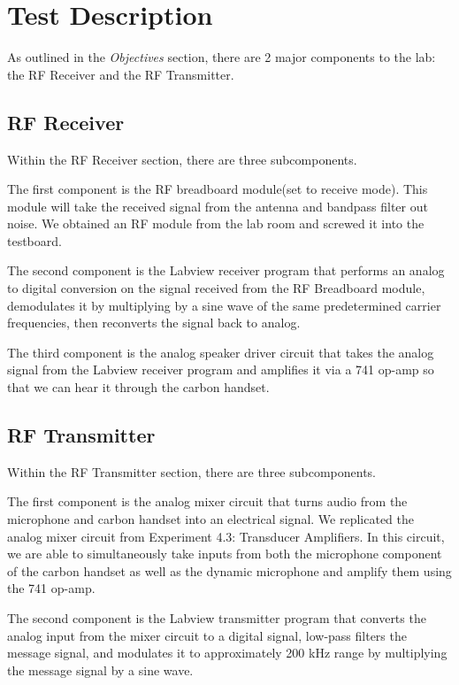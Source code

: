 \documentclass[10pt]{article}
\begin{document}
\medskip


\section{Test Description}

As outlined in the \textit{Objectives} section, there are 2 major components to the lab: the RF Receiver and the RF Transmitter. 

\subsection{RF Receiver}
Within the RF Receiver section, there are three subcomponents. 

The first component is the RF breadboard module(set to receive mode). This module will take the received signal from the antenna and bandpass filter out noise. We obtained an RF module from the lab room and screwed it into the testboard.  

The second component is the Labview receiver program that performs an analog to digital conversion on the signal received from the RF Breadboard module, demodulates it by multiplying by a sine wave of the same predetermined carrier frequencies, then reconverts the signal back to analog. 

The third component is the analog speaker driver circuit that takes the analog signal from the Labview receiver program and amplifies it via a 741 op-amp so that we can hear it through the carbon handset. 
 

\subsection{RF Transmitter}
Within the RF Transmitter section, there are three subcomponents. 

The first component is the analog mixer circuit that turns audio from the microphone and carbon handset into an electrical signal. We replicated the analog mixer circuit from Experiment 4.3: Transducer Amplifiers. In this circuit, we are able to simultaneously take inputs from both the microphone component of the carbon handset as well as the dynamic microphone and amplify them using the 741 op-amp.

The second component is the Labview transmitter program that converts the analog input from the mixer circuit to a digital signal, low-pass filters the message signal, and modulates it to approximately 200 kHz range by multiplying the message signal by a sine wave.   
\end{document}
